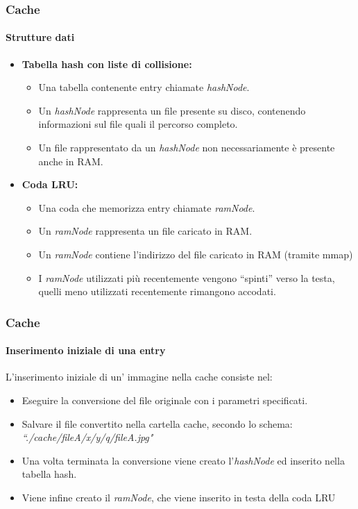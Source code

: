 \documentclass{beamer}
\begin{document}
\begin{frame}
\frametitle{Cache}
\framesubtitle{Strutture dati}
\begin{itemize}
\item \textbf{Tabella hash con liste di collisione:}
\begin{itemize}
\item Una tabella contenente entry chiamate \textit{hashNode}.
\item Un \textit{hashNode} rappresenta un file presente su disco, contenendo informazioni
sul file quali il percorso completo.
\item Un file rappresentato da un \textit{hashNode} non necessariamente è presente anche
in RAM.
\end{itemize}
\end{itemize}



\begin{itemize}
\item \textbf{Coda LRU:}
\begin{itemize}
\item Una coda che memorizza entry chiamate \textit{ramNode}.
\item Un \textit{ramNode} rappresenta un file caricato in RAM.
\item Un \textit{ramNode} contiene l'indirizzo del file caricato in RAM (tramite mmap)
\item I \textit{ramNode} utilizzati più recentemente vengono “spinti” verso la testa, quelli
meno utilizzati recentemente rimangono accodati.
\end{itemize}
\end{itemize}
\end{frame}
\begin{frame}
\frametitle{Cache}
\framesubtitle{Inserimento iniziale di una entry}

L'inserimento iniziale di un' immagine nella cache consiste nel:


\begin{itemize}
\item Eseguire la conversione del file originale con i parametri specificati.
\item Salvare il file convertito nella cartella cache, secondo lo schema: \textit{“./cache/fileA/x/y/q/fileA.jpg"}

\item Una volta terminata la conversione viene creato l'\textit{hashNode} ed inserito nella
tabella hash.
\item Viene infine creato il \textit{ramNode}, che viene inserito in testa della coda LRU
\end{itemize}
\end{frame}
\end{document}
